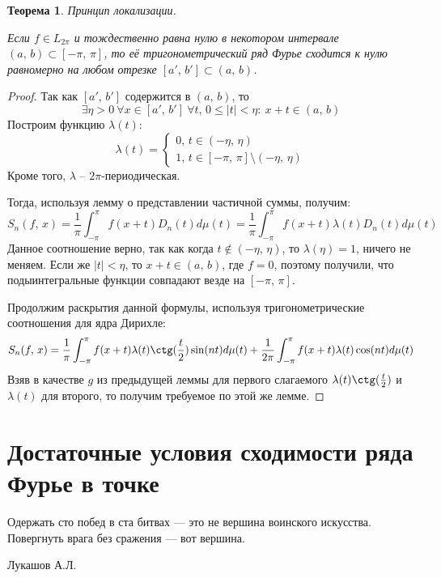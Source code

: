 \documentclass[a4paper,12pt]{article}
\renewcommand{\leq}{\ensuremath{\leqslant}}
\theoremstyle{plain}
\newtheorem{theorem}{Теорема}[section]
\theoremstyle{definition}
\theoremstyle{remark}
\begin{document}
\begin{theorem}
	Принцип локализации.

	Если $f \in L_{2\pi}$ и тождественно равна нулю в некотором интервале $(a,\,b) \subset [-\pi,\,\pi]$, то её тригонометрический ряд Фурье сходится к нулю равномерно на любом отрезке $[a',\,b'] \subset (a,\,b)$.
\end{theorem}

\begin{proof}
	Так как $[a',\,b']$ содержится в $(a,\,b)$, то
	\[\exists \eta > 0 \: \forall x \in [a',\,b'] \: \forall t,\, 0 \leq |t| < \eta :\: x + t \in (a,\,b)\]
	Построим функцию $\lambda(t)$:
	\[
		\lambda(t) = \begin{cases}
			0,\, t \in (-\eta,\,\eta) \\
			1,\, t \in [-\pi,\,\pi]\setminus (-\eta,\,\eta)
		\end{cases}
	\]
	Кроме того, $\lambda$ -- $2\pi$-периодическая.

	Тогда, используя лемму о представлении частичной суммы, получим:
	\[
		S_n(f,\,x) = \frac{1}{\pi}\int_{-\pi}^\pi f(x + t)D_n(t)d\mu(t) = \frac{1}{\pi}\int_{-\pi}^\pi f(x + t)\lambda(t)D_n(t)d\mu(t)
	\]
	Данное соотношение верно, так как когда $t \not\in (-\eta,\,\eta)$, то $\lambda(\eta) = 1$, ничего не меняем. Если же $|t| < \eta$, то $x + t \in (a,\,b)$, где $f = 0$, поэтому получили, что подыинтегральные функции совпадают везде на $[-\pi,\,\pi]$.

	Продолжим раскрытия данной формулы, используя тригонометрические соотношения для ядра Дирихле:
	\begin{align*}
		S_n(f,\,x) = \frac{1}{\pi}\int_{-\pi}^\pi f(x + t)\lambda(t)\ctg(\frac{t}{2})\sin(nt)d\mu(t) + \frac{1}{2\pi}\int_{-\pi}^\pi f(x+t)\lambda(t)\cos(nt)d\mu(t)
	\end{align*}
	Взяв в качестве $g$ из предыдущей леммы для первого слагаемого $\lambda(t)\ctg(\frac{t}{2})$ и $\lambda(t)$ для второго, то получим требуемое по этой же лемме.

\end{proof}

\section{Достаточные условия сходимости ряда Фурье в точке}

\epigraph{Одержать сто побед в ста битвах — это не вершина воинского искусства. Повергнуть врага без сражения — вот вершина.}{Лукашов А.Л.}
\end{document}
